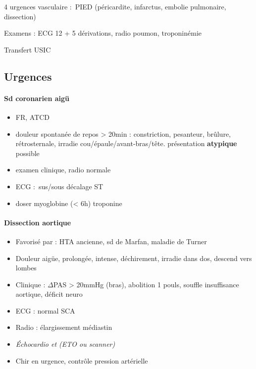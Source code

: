 \documentclass{article}
\begin{document}
4 urgences vasculaire : PIED (péricardite, infarctus, embolie pulmonaire,
dissection)

Examens : ECG 12 + 5 dérivations, radio poumon, troponinémie

Transfert USIC

\subsection{Urgences}

\paragraph{Sd coronarien aigü}
\begin{itemize}
  \item FR, ATCD
  \item douleur spontanée de repos > 20min : constriction, pesanteur, brûlure,
    rétrosternale, irradie  cou/épaule/avant-bras/tête. \danger présentation
    \textbf{atypique} possible
  \item examen clinique, radio normale
  \item ECG : sus/sous décalage ST
  \item doser myoglobine (< 6h) \lor{} troponine
\end{itemize}

\paragraph{Dissection aortique}
\begin{itemize}
  \item Favorisé par : HTA ancienne, sd de Marfan, maladie de Turner
  \item Douleur aigüe, prolongée, intense, déchirement, irradie dans dos, descend
    vers lombes
  \item Clinique : $\Delta$PAS > 20mmHg (bras), abolition 1 pouls, souffle
    insuffisance aortique, déficit neuro
  \item ECG : normal \lor{} SCA
  \item Radio : élargissement médiastin
  \item \textit{Échocardio et (ETO ou scanner)} 
  \item Chir en urgence, contrôle pression artérielle
\end{itemize}
\end{document}
